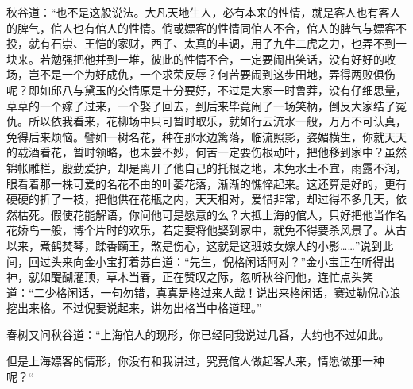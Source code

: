 \documentclass[12pt,UTF8]{ctexbook}
\begin{document}
{{{秋谷道：“也不是这般说法。大凡天地生人，必有本来的性情，就是客人也有客人的脾气，倌人也有倌人的性情。倘或嫖客的性情同倌人不合，倌人的脾气与嫖客不投，就有石崇、王恺的家财，西子、太真的丰调，用了九牛二虎之力，也弄不到一块来。若勉强把他并到一堆，彼此的性情不合，一定要闹出笑话，没有好好的收场，岂不是一个为好成仇，一个求荣反辱？何苦要闹到这步田地，弄得两败俱伤呢？即如邱八与黛玉的交情原是十分要好，不过是大家一时鲁莽，没有仔细思量，草草的一个嫁了过来，一个娶了回去，到后来毕竟闹了一场笑柄，倒反大家结了冤仇。所以依我看来，花柳场中只可暂时取乐，就如行云流水一般，万万不可认真，免得后来烦恼。譬如一树名花，种在那水边篱落，临流照影，姿媚横生，你就天天的载酒看花，暂时领略，也未尝不妙，何苦一定要伤根动叶，把他移到家中？虽然锦帐雕栏，殷勤爱护，却是离开了他自己的托根之地，未免水土不宜，雨露不润，眼看着那一株可爱的名花不由的叶萎花落，渐渐的憔悴起来。这还算是好的，更有硬硬的折了一枝，把他供在花瓶之内，天天相对，爱惜非常，却过得不多几天，依然枯死。假使花能解语，你问他可是愿意的么？大抵上海的倌人，只好把他当作名花娇鸟一般，博个片时的欢乐，若定要将他娶到家中，就免不得要杀风景了。从古以来，煮鹤焚琴，蹂香躏王，煞是伤心，这就是这班妓女嫁人的小影……”说到此间，回过头来向金小宝打着苏白道：“先生，倪格闲话阿对？”金小宝正在听得出神，就如醍醐灌顶，草木当春，正在赞叹之际，忽听秋谷问他，连忙点头笑道：“二少格闲话，一句勿错，真真是格过来人哉！说出来格闲话，赛过勒倪心浪挖出来格。不过倪要说起来，讲勿出格当中格道理。”

春树又问秋谷道：“上海倌人的现形，你已经同我说过几番，大约也不过如此。

但是上海嫖客的情形，你没有和我讲过，究竟倌人做起客人来，情愿做那一种呢？“

}}}
\end{document}
